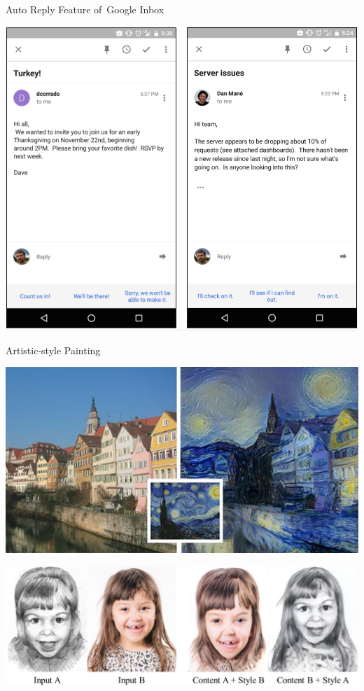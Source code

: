 \documentclass{beamer}
\begin{document}
  {
    \begin{frame}{Auto Reply Feature of~Google Inbox}
      \begin{center}
        \includegraphics[height=.85\textheight]{../img/Inbox_auto_reply.png}
      \end{center}
    \end{frame}
  }

  {
    \begin{frame}{Artistic-style Painting}
      \begin{center}
        \includegraphics[height=.4\textheight]{../img/art_Van_Gogh.jpg}
        \pause

        \includegraphics[height=.44\textheight]{../img/art_girl.png}
      \end{center}
    \end{frame}
  }
\end{document}
